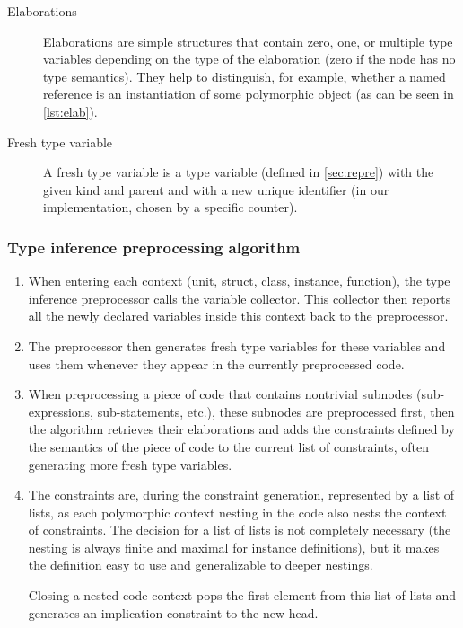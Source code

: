 \begin{description}
    \item[Elaborations] Elaborations are simple structures that contain zero, one, or multiple type variables depending on the type of the elaboration (zero if the node has no type semantics). They help to distinguish, for example, whether a named reference is an instantiation of some polymorphic object (as can be seen in \cref{lst:elab}).

    \item[Fresh type variable] A fresh type variable is a type variable (defined in \cref{sec:repre}) with the given kind and parent and with a new unique identifier (in our implementation, chosen by a specific counter).
\end{description}

\subsubsection{Type inference preprocessing algorithm}

\begin{enumerate}
    \item When entering each context (unit, struct, class, instance, function), the type inference preprocessor calls the variable collector. This collector then reports all the newly declared variables inside this context back to the preprocessor.

    \item The preprocessor then generates fresh type variables for these variables and uses them whenever they appear in the currently preprocessed code.

    \item When preprocessing a piece of code that contains nontrivial subnodes (sub-expressions, sub-statements, etc.), these subnodes are preprocessed first, then the algorithm retrieves their elaborations and adds the constraints defined by the semantics of the piece of code to the current list of constraints, often generating more fresh type variables.

    \item The constraints are, during the constraint generation, represented by a list of lists, as each polymorphic context nesting in the code also nests the context of constraints. The decision for a list of lists is not completely necessary (the nesting is always finite and maximal for instance definitions), but it makes the definition easy to use and generalizable to deeper nestings.

    Closing a nested code context pops the first element from this list of lists and generates an implication constraint to the new head.
\end{enumerate}

